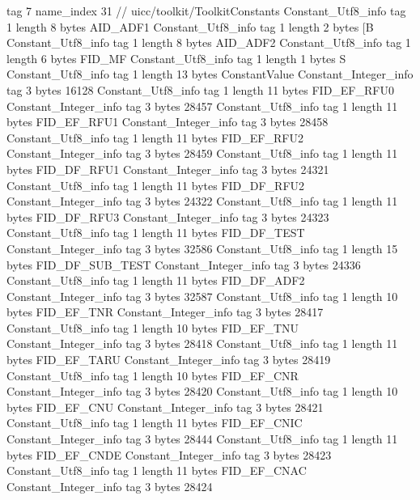 {{{			tag	7
			name_index	31		// uicc/toolkit/ToolkitConstants
		}
		Constant_Utf8_info {
			tag	1
			length	8
			bytes	AID_ADF1
		}
		Constant_Utf8_info {
			tag	1
			length	2
			bytes	[B
		}
		Constant_Utf8_info {
			tag	1
			length	8
			bytes	AID_ADF2
		}
		Constant_Utf8_info {
			tag	1
			length	6
			bytes	FID_MF
		}
		Constant_Utf8_info {
			tag	1
			length	1
			bytes	S
		}
		Constant_Utf8_info {
			tag	1
			length	13
			bytes	ConstantValue
		}
		Constant_Integer_info {
			tag	3
			bytes	16128
		}
		Constant_Utf8_info {
			tag	1
			length	11
			bytes	FID_EF_RFU0
		}
		Constant_Integer_info {
			tag	3
			bytes	28457
		}
		Constant_Utf8_info {
			tag	1
			length	11
			bytes	FID_EF_RFU1
		}
		Constant_Integer_info {
			tag	3
			bytes	28458
		}
		Constant_Utf8_info {
			tag	1
			length	11
			bytes	FID_EF_RFU2
		}
		Constant_Integer_info {
			tag	3
			bytes	28459
		}
		Constant_Utf8_info {
			tag	1
			length	11
			bytes	FID_DF_RFU1
		}
		Constant_Integer_info {
			tag	3
			bytes	24321
		}
		Constant_Utf8_info {
			tag	1
			length	11
			bytes	FID_DF_RFU2
		}
		Constant_Integer_info {
			tag	3
			bytes	24322
		}
		Constant_Utf8_info {
			tag	1
			length	11
			bytes	FID_DF_RFU3
		}
		Constant_Integer_info {
			tag	3
			bytes	24323
		}
		Constant_Utf8_info {
			tag	1
			length	11
			bytes	FID_DF_TEST
		}
		Constant_Integer_info {
			tag	3
			bytes	32586
		}
		Constant_Utf8_info {
			tag	1
			length	15
			bytes	FID_DF_SUB_TEST
		}
		Constant_Integer_info {
			tag	3
			bytes	24336
		}
		Constant_Utf8_info {
			tag	1
			length	11
			bytes	FID_DF_ADF2
		}
		Constant_Integer_info {
			tag	3
			bytes	32587
		}
		Constant_Utf8_info {
			tag	1
			length	10
			bytes	FID_EF_TNR
		}
		Constant_Integer_info {
			tag	3
			bytes	28417
		}
		Constant_Utf8_info {
			tag	1
			length	10
			bytes	FID_EF_TNU
		}
		Constant_Integer_info {
			tag	3
			bytes	28418
		}
		Constant_Utf8_info {
			tag	1
			length	11
			bytes	FID_EF_TARU
		}
		Constant_Integer_info {
			tag	3
			bytes	28419
		}
		Constant_Utf8_info {
			tag	1
			length	10
			bytes	FID_EF_CNR
		}
		Constant_Integer_info {
			tag	3
			bytes	28420
		}
		Constant_Utf8_info {
			tag	1
			length	10
			bytes	FID_EF_CNU
		}
		Constant_Integer_info {
			tag	3
			bytes	28421
		}
		Constant_Utf8_info {
			tag	1
			length	11
			bytes	FID_EF_CNIC
		}
		Constant_Integer_info {
			tag	3
			bytes	28444
		}
		Constant_Utf8_info {
			tag	1
			length	11
			bytes	FID_EF_CNDE
		}
		Constant_Integer_info {
			tag	3
			bytes	28423
		}
		Constant_Utf8_info {
			tag	1
			length	11
			bytes	FID_EF_CNAC
		}
		Constant_Integer_info {
			tag	3
			bytes	28424
}}}
